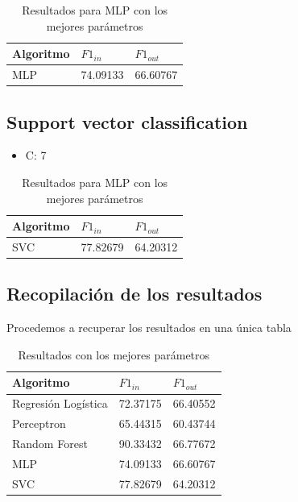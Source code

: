 \documentclass[11pt]{article}
\begin{document}
\begin{table}[h!]
    \centering
    \begin{tabular}{|l|l|l|}
    \hline
    Algoritmo    & $F1_{in}$  & $F1_{out}$ \\ \hline
    MLP   & 74.09133 & 66.60767 \\ \hline
    \end{tabular}
    \caption{Resultados para MLP con los mejores parámetros}
\end{table}

\subsection{Support vector classification}

\begin{itemize}
    \item C: 7
\end{itemize}

\begin{table}[h!]
    \centering
    \begin{tabular}{|l|l|l|}
    \hline
    Algoritmo    & $F1_{in}$  & $F1_{out}$ \\ \hline
    SVC   & 77.82679 & 64.20312 \\ \hline
    \end{tabular}
    \caption{Resultados para MLP con los mejores parámetros}
\end{table}


\subsection{Recopilación de los resultados}

Procedemos a recuperar los resultados en una única tabla

\begin{table}[H]
    \centering
    \begin{tabular}{|l|l|l|}
    \hline
    Algoritmo    & $F1_{in} $  & $F1_{out}$ \\ \hline
    Regresión Logística   & 72.37175  & 66.40552 \\ \hline
    Perceptron & 65.44315 & 60.43744 \\ \hline
    Random Forest   & 90.33432 & 66.77672 \\ \hline
    MLP   & 74.09133 & 66.60767 \\ \hline
    SVC   & 77.82679 & 64.20312 \\ \hline
    \end{tabular}
    \caption{Resultados con los mejores parámetros}
\end{table}
\end{document}
